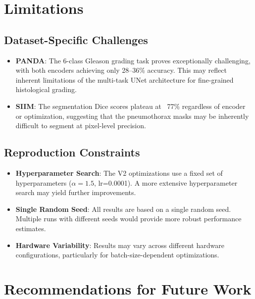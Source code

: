 \documentclass[11pt,a4paper,twoside]{report}
\begin{document}
\section{Limitations}

\subsection{Dataset-Specific Challenges}

\begin{itemize}
    \item \textbf{PANDA}: The 6-class Gleason grading task proves exceptionally challenging, with both encoders achieving only 28--36\% accuracy. This may reflect inherent limitations of the multi-task UNet architecture for fine-grained histological grading.
    \item \textbf{SIIM}: The segmentation Dice scores plateau at ~77\% regardless of encoder or optimization, suggesting that the pneumothorax masks may be inherently difficult to segment at pixel-level precision.
\end{itemize}

\subsection{Reproduction Constraints}

\begin{itemize}
    \item \textbf{Hyperparameter Search}: The V2 optimizations use a fixed set of hyperparameters ($\alpha=1.5$, lr=0.0001). A more extensive hyperparameter search may yield further improvements.
    \item \textbf{Single Random Seed}: All results are based on a single random seed. Multiple runs with different seeds would provide more robust performance estimates.
    \item \textbf{Hardware Variability}: Results may vary across different hardware configurations, particularly for batch-size-dependent optimizations.
\end{itemize}

\section{Recommendations for Future Work}
\end{document}
